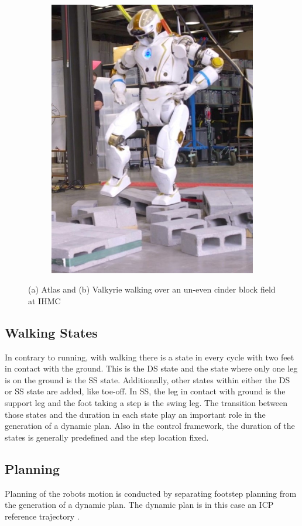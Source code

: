 \begin{figure}[h]
\begin{subfigure}{0.45\textwidth}
  \includegraphics[width=.8\linewidth]{STYLESTUFF/Valkyrie.jpeg}
  \caption{}
   \label{fig:valkyrie}
  \end{subfigure}
  \caption{(a) Atlas \cite{oldatlas} and (b) Valkyrie \cite{valkyrie} walking over an un-even cinder block field at IHMC }
  \label{fig:robots}
\end{figure}
\subsection{Walking States}
In contrary to running, with walking there is a state in every cycle with two feet in contact with the ground. This is the \ac{DS} state and the state where only one leg is on the ground is the \ac{SS} state. Additionally, other states within either the \ac{DS} or \ac{SS} state are added, like toe-off. In \ac{SS}, the leg in contact with ground is the support leg and the foot taking a step is the swing leg. The transition between those states and the duration in each state play an important role in the generation of a dynamic plan. Also in the control framework, the duration of the states is generally predefined and the step location fixed.
\subsection{Planning}
Planning of the robots motion is conducted by separating footstep planning from the generation of a dynamic plan. The dynamic plan is in this case an \ac{ICP} reference trajectory \cite{seyde2018inclusion}.

